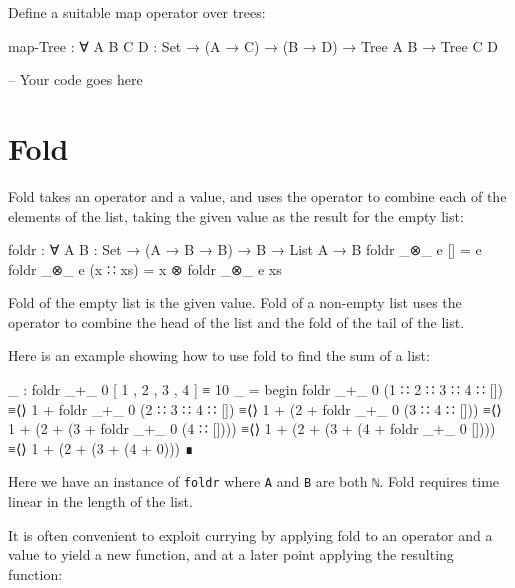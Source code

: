 Define a suitable map operator over trees:

\begin{myDisplay}
map-Tree : ∀ {A B C D : Set} → (A → C) → (B → D) → Tree A B → Tree C D
\end{myDisplay}

\begin{fence}
\begin{code}
-- Your code goes here
\end{code}
\end{fence}

\hypertarget{Lists-Fold}{%
\section{Fold}\label{Lists-Fold}}

Fold takes an operator and a value, and uses the operator to combine
each of the elements of the list, taking the given value as the result
for the empty list:

\begin{fence}
\begin{code}
foldr : ∀ {A B : Set} → (A → B → B) → B → List A → B
foldr _⊗_ e []        =  e
foldr _⊗_ e (x ∷ xs)  =  x ⊗ foldr _⊗_ e xs
\end{code}
\end{fence}

Fold of the empty list is the given value. Fold of a non-empty list uses
the operator to combine the head of the list and the fold of the tail of
the list.

Here is an example showing how to use fold to find the sum of a list:

\begin{fence}
\begin{code}
_ : foldr _+_ 0 [ 1 , 2 , 3 , 4 ] ≡ 10
_ =
  begin
    foldr _+_ 0 (1 ∷ 2 ∷ 3 ∷ 4 ∷ [])
  ≡⟨⟩
    1 + foldr _+_ 0 (2 ∷ 3 ∷ 4 ∷ [])
  ≡⟨⟩
    1 + (2 + foldr _+_ 0 (3 ∷ 4 ∷ []))
  ≡⟨⟩
    1 + (2 + (3 + foldr _+_ 0 (4 ∷ [])))
  ≡⟨⟩
    1 + (2 + (3 + (4 + foldr _+_ 0 [])))
  ≡⟨⟩
    1 + (2 + (3 + (4 + 0)))
  ∎
\end{code}
\end{fence}

Here we have an instance of \texttt{foldr} where \texttt{A} and
\texttt{B} are both \texttt{ℕ}. Fold requires time linear in the length
of the list.

It is often convenient to exploit currying by applying fold to an
operator and a value to yield a new function, and at a later point
applying the resulting function:

